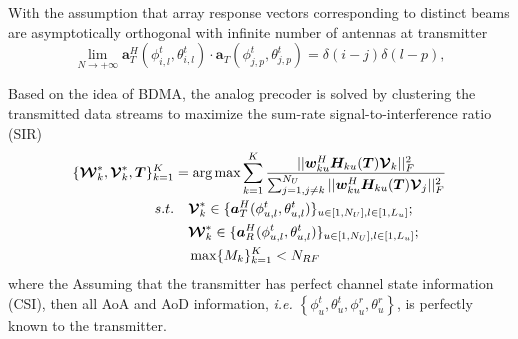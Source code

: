 \documentclass[conference]{IEEEtran}
\def\argmax{\mathop{\mbox{arg\,max}}}
\begin{document}
With the assumption that array response vectors corresponding to distinct beams are asymptotically orthogonal with infinite number of antennas at transmitter
\begin{equation}\label{Eq:assumption}
\lim_{N\rightarrow +\infty} \bm{a}^H_{T}(\phi^t_{i,l},\theta^t_{i,l}) \cdot\bm{a}_{T}(\phi^t_{j,p},\theta^t_{j,p})=\delta(i-j)\delta(l-p),
\end{equation}

Based on the idea of BDMA, the analog precoder is solved by clustering the transmitted data streams to maximize the sum-rate signal-to-interference ratio (SIR)
\begin{align}\label{eq:group-scheduling}
\{\bm{\mathcal{W}}^*_k, \bm{\mathcal{V}}^*_k,\bm{T}\}_{k=1}^{K} &= \argmax \sum_{k=1}^{K}\frac{||\bm{w}^H_{ku} \bm{H}_{ku}(\bm{T}) \bm{\mathcal{V}}_k||_F^2}{\sum_{j=1,j\neq k}^{N_U}||\bm{w}^H_{ku} \bm{H}_{ku}(\bm{T}) \bm{\mathcal{V}}_j||_F^2}  \\ \nonumber
s.t. &\quad \bm{\mathcal{V}}^*_{k} \in  \{\bm{a}^H_{T}(\phi^t_{u,l},\theta^t_{u,l})\}_{u\in [1,N_U], l\in [1,L_u]}; \\
&\quad \bm{\mathcal{W}}^*_k \in \{\bm{a}^H_{R}(\phi^t_{u,l},\theta^t_{u,l})\}_{u\in [1,N_U], l\in [1,L_u]};\nonumber\\
&\quad \max\{M_k\}_{k=1}^K<N_{RF}\nonumber
\end{align}
where the 
Assuming that the transmitter has perfect channel state information (CSI), then all AoA and AoD information, {\em i.e.} $\left\{\phi^t_u,\theta^t_u,\phi^r_u,\theta^r_u\right\}$, is perfectly known to the transmitter. 
\end{document}

